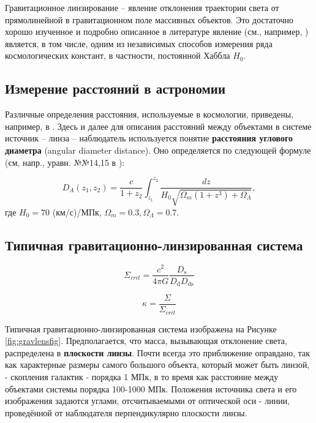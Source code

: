 Гравитационное линзирование -- явление отклонения траектории света от прямолинейной в гравитационном поле массивных объектов.  Это достаточно хорошо изученное и подробно описанное в литературе явление (см., например, \cite{gravlensbook}) является, в том числе, одним из независимых способов измерения ряда космологических констант, в частности, постоянной Хаббла $H_0$. 

\subsection{Измерение расстояний в астрономии}

Различные определения расстояния, используемые в космологии, приведены, например, в \cite{distance_measures}. Здесь и далее для описания расстояний между объектами в системе источник -- линза -- наблюдатель используется понятие \textbf{расстояния углового диаметра} (angular diameter distance). Оно определяется по следующей формуле (см, напр., уравн. №№14,15 в \cite{distance_measures}):

\begin{equation}\label{ang_dia_dist}
D_{A}\left(z_{1}, z_{2}\right)=\frac{c}{1+z_{2}} \int_{z_{1}}^{z_{2}} \frac{d z}{H_{0} \sqrt{\Omega_{m}\left(1+z^{3}\right)+\Omega_{\Lambda}}},
\end{equation}
где $H_0=70$ (км/с)/МПк, $\Omega_m=0.3, \Omega_\Lambda=0.7$.

\subsection{Типичная гравитационно-линзированная система}

\begin{equation}\label{sigmacrit}
\Sigma_{crit}=\frac{c^{2}}{4 \pi G} \frac{D_{\mathrm{s}}}{D_{\mathrm{d}} D_{\mathrm{ds}}}
\end{equation}

\begin{equation}\label{convergence}
\kappa = \frac{\Sigma}{\Sigma_{crit}}
\end{equation}

Типичная гравитационно-линзированная система изображена на Рисунке \ref{fig:gravlensfig}. Предполагается, что масса, вызывающая отклонение света, распределена в \textbf{плоскости линзы}. Почти всегда это приближение оправдано, так как характерные размеры самого большого объекта, который может быть линзой, - скопления галактик - порядка 1 МПк, в то время как расстояние между объектами системы порядка 100-1000 МПк. Положения источника света и его изображения задаются углами, отсчитываемыми от оптической оси - линии, проведённой от наблюдателя перпендикулярно плоскости линзы.

